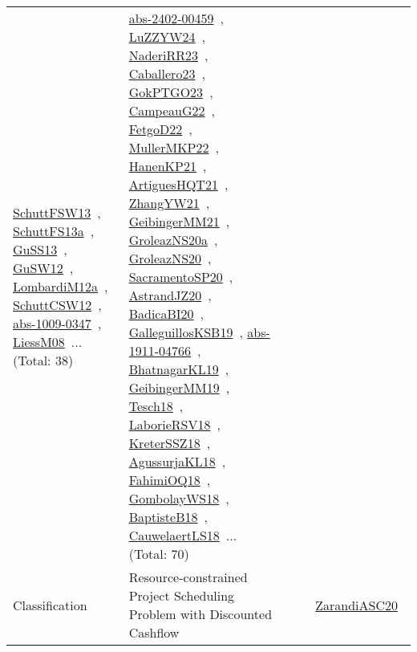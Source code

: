 {\begin{longtable}{lp{3cm}>{\raggedright\arraybackslash}p{6cm}>{\raggedright\arraybackslash}p{6cm}>{\raggedright\arraybackslash}p{8cm}}
\href{../works/SchuttFSW13.pdf}{SchuttFSW13}~\cite{SchuttFSW13}, \href{../works/SchuttFS13a.pdf}{SchuttFS13a}~\cite{SchuttFS13a}, \href{../works/GuSS13.pdf}{GuSS13}~\cite{GuSS13}, \href{../works/GuSW12.pdf}{GuSW12}~\cite{GuSW12}, \href{../works/LombardiM12a.pdf}{LombardiM12a}~\cite{LombardiM12a}, \href{../works/SchuttCSW12.pdf}{SchuttCSW12}~\cite{SchuttCSW12}, \href{../works/abs-1009-0347.pdf}{abs-1009-0347}~\cite{abs-1009-0347}, \href{../works/LiessM08.pdf}{LiessM08}~\cite{LiessM08}... (Total: 38) & \href{../works/abs-2402-00459.pdf}{abs-2402-00459}~\cite{abs-2402-00459}, \href{../works/LuZZYW24.pdf}{LuZZYW24}~\cite{LuZZYW24}, \href{../works/NaderiRR23.pdf}{NaderiRR23}~\cite{NaderiRR23}, \href{../works/Caballero23.pdf}{Caballero23}~\cite{Caballero23}, \href{../works/GokPTGO23.pdf}{GokPTGO23}~\cite{GokPTGO23}, \href{../works/CampeauG22.pdf}{CampeauG22}~\cite{CampeauG22}, \href{../works/FetgoD22.pdf}{FetgoD22}~\cite{FetgoD22}, \href{../works/MullerMKP22.pdf}{MullerMKP22}~\cite{MullerMKP22}, \href{../works/HanenKP21.pdf}{HanenKP21}~\cite{HanenKP21}, \href{../works/ArtiguesHQT21.pdf}{ArtiguesHQT21}~\cite{ArtiguesHQT21}, \href{../works/ZhangYW21.pdf}{ZhangYW21}~\cite{ZhangYW21}, \href{../works/GeibingerMM21.pdf}{GeibingerMM21}~\cite{GeibingerMM21}, \href{../works/GroleazNS20a.pdf}{GroleazNS20a}~\cite{GroleazNS20a}, \href{../works/GroleazNS20.pdf}{GroleazNS20}~\cite{GroleazNS20}, \href{../works/SacramentoSP20.pdf}{SacramentoSP20}~\cite{SacramentoSP20}, \href{../works/AstrandJZ20.pdf}{AstrandJZ20}~\cite{AstrandJZ20}, \href{../works/BadicaBI20.pdf}{BadicaBI20}~\cite{BadicaBI20}, \href{../works/GalleguillosKSB19.pdf}{GalleguillosKSB19}~\cite{GalleguillosKSB19}, \href{../works/abs-1911-04766.pdf}{abs-1911-04766}~\cite{abs-1911-04766}, \href{../works/BhatnagarKL19.pdf}{BhatnagarKL19}~\cite{BhatnagarKL19}, \href{../works/GeibingerMM19.pdf}{GeibingerMM19}~\cite{GeibingerMM19}, \href{../works/Tesch18.pdf}{Tesch18}~\cite{Tesch18}, \href{../works/LaborieRSV18.pdf}{LaborieRSV18}~\cite{LaborieRSV18}, \href{../works/KreterSSZ18.pdf}{KreterSSZ18}~\cite{KreterSSZ18}, \href{../works/AgussurjaKL18.pdf}{AgussurjaKL18}~\cite{AgussurjaKL18}, \href{../works/FahimiOQ18.pdf}{FahimiOQ18}~\cite{FahimiOQ18}, \href{../works/GombolayWS18.pdf}{GombolayWS18}~\cite{GombolayWS18}, \href{../works/BaptisteB18.pdf}{BaptisteB18}~\cite{BaptisteB18}, \href{../works/CauwelaertLS18.pdf}{CauwelaertLS18}~\cite{CauwelaertLS18}... (Total: 70)\\
\index{Resource-constrained Project Scheduling Problem with Discounted Cashflow}\index{Classification!Resource-constrained Project Scheduling Problem with Discounted Cashflow}Classification & Resource-constrained Project Scheduling Problem with Discounted Cashflow &  &  & \href{../works/ZarandiASC20.pdf}{ZarandiASC20}~\cite{ZarandiASC20}\\

\end{longtable}}
